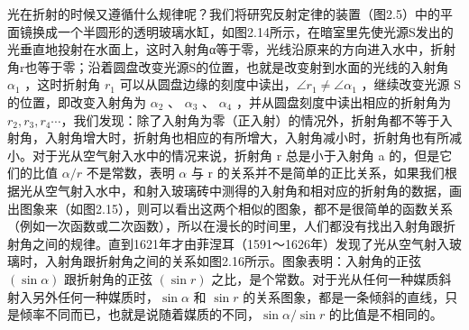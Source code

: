 光在折射的时候又遵循什么规律呢？我们将研究反射定律的装置（图2.5）中的平面镜换成一个半圆形的透明玻璃水缸，如图2.14所示，在暗室里先使光源S发出的光垂直地投射在水面上，这时入射角α等于零，光线沿原来的方向进入水中，折射角r也等于零；沿着圆盘改变光源S的位置，也就是改变射到水面的光线的入射角
\(\alpha_{1}\) ，这时折射角 \(r_{1}\)
可以从圆盘边缘的刻度中读出，\(\angle r_{1}\neq\angle\alpha_{1}\)
，继续改变光源 S 的位置，即改变入射角为 \(\alpha_{2}\) 、 \(\alpha_{3}\)
、 \(\alpha_{4}\) ，并从圆盘刻度中读出相应的折射角为
\(r_2, r_3, r_4\cdots\)，我们发现：除了入射角为零（正入射）的情况外，折射角都不等于入射角，入射角增大时，折射角也相应的有所增大，入射角减小时，折射角也有所减小。对于光从空气射入水中的情况来说，折射角
r 总是小于入射角 a 的，但是它们的比值 \(\alpha/r\) 不是常数，表明
\(\alpha\) 与 r
的关系并不是简单的正比关系，如果我们根据光从空气射入水中，和射入玻璃砖中测得的入射角和相对应的折射角的数据，画出图象来（如图2.15），则可以看出这两个相似的图象，都不是很简单的函数关系（例如一次函数或二次函数），所以在漫长的时间里，人们都没有找出入射角跟折射角之间的规律。直到1621年才由菲涅耳（1591～1626年）发现了光从空气射入玻璃时，入射角跟折射角之间的关系如图2.16所示。图象表明：入射角的正弦
\((\sin\alpha)\) 跟折射角的正弦 \((\sin r)\)
之比，是个常数。对于光从任何一种媒质斜射入另外任何一种媒质时，\(\sin\alpha\)
和 \(\sin r\)
的关系图象，都是一条倾斜的直线，只是倾率不同而已，也就是说随着媒质的不同，\(\sin\alpha/\sin r\)
的比值是不相同的。


